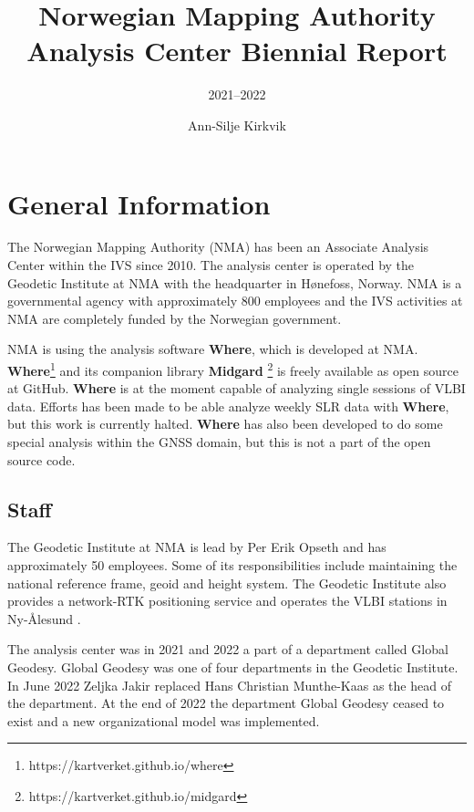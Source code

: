 \documentclass[twocolumn,twoside]{svmultivs_br} %
\title*{Norwegian Mapping Authority Analysis Center Biennial Report}
\subtitle{2021--2022}
\author{Ann-Silje Kirkvik}
\institute{Norwegian Mapping Authority (NMA)}
\begin{document}
%
\maketitle       %
%
%
\section{General Information}
%
The Norwegian Mapping Authority (NMA) has been an Associate Analysis Center
within the IVS since 2010. The analysis center is operated by the Geodetic
Institute at NMA with the headquarter in H\o nefoss, Norway. NMA is a governmental
agency with approximately 800 employees and the IVS activities at NMA are
completely funded by the Norwegian government.

NMA is using the analysis software \textbf{Where}, which is developed at NMA.
\textbf{Where}\footnote{https://kartverket.github.io/where} and its companion 
library \textbf{Midgard} \footnote{https://kartverket.github.io/midgard} is
freely available as open source at GitHub.
\textbf{Where} is at the moment capable of analyzing single sessions of VLBI data.
Efforts has been made to be able analyze weekly SLR data with \textbf{Where}, but 
this work is currently halted. \textbf{Where} has also been developed to do some 
special analysis within the GNSS domain, but this is not a part of the open source
code.
 
\subsection{Staff}
The Geodetic Institute at NMA is lead by Per Erik Opseth and has approximately 50 employees. Some of its 
responsibilities include maintaining the
national reference frame, geoid and height system. The Geodetic Institute also provides a network-RTK positioning
service and operates the VLBI stations in Ny-\AA lesund \cite{ivsgm2022-nyal}.

The analysis center was in 2021 and 2022 a part of a department called Global Geodesy. Global Geodesy was one of
four departments in the Geodetic Institute. In June 2022 Zeljka Jakir 
replaced Hans Christian Munthe-Kaas as the head of the department. At the end of 2022 the department
Global Geodesy ceased to exist and a new organizational model was implemented. 
\end{document}

